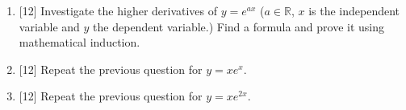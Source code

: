 \documentclass[12pt]{article}
\newcommand{\RR}{{\mathbb R}}
\begin{document}
\begin{enumerate}
\item{[12]} Investigate the higher derivatives of $y=e^{ax}$ ($a\in \RR$, $x$ is the independent variable and $y$ the dependent
  variable.)
  Find a formula and prove it using mathematical induction.

\item{[12]}  Repeat the previous question for $y=xe^x$.

\item{[12]}  Repeat the previous question for $y=xe^{2x}$.


\end{enumerate}
\end{document}
